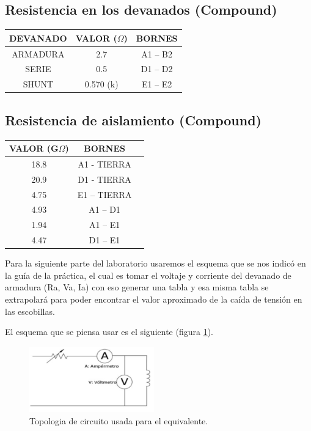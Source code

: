 \subsection*{Resistencia en los devanados (Compound)}

\begin{tabular}{|c|c|c|}
\hline
DEVANADO & VALOR ($\Omega$) & BORNES \\
\hline
ARMADURA & 2.7 & A1 – B2 \\
SERIE & 0.5 & D1 – D2 \\
SHUNT & 0.570 (k) & E1 – E2 \\
\hline
\end{tabular}

\subsection*{Resistencia de aislamiento (Compound)}

\begin{tabular}{|c|c|c|}
\hline
VALOR (G$\Omega$) & BORNES \\
\hline
18.8 & A1 - TIERRA \\
20.9 & D1 - TIERRA \\
4.75 & E1 – TIERRA \\
4.93 & A1 – D1 \\
1.94 & A1 – E1 \\
4.47 & D1 – E1 \\
\hline
\end{tabular}

Para la siguiente parte del laboratorio usaremos el esquema que se nos indicó en la guía de la práctica, el cual es tomar el voltaje y corriente del devanado de armadura (Ra, Va, Ia) con eso generar una tabla y esa misma tabla se extrapolará para poder encontrar el valor aproximado de la caída de tensión en las escobillas.

El esquema que se piensa usar es el siguiente (figura \ref{fig:modelol}).
\begin{figure}[ht!]
    \centering
    \includegraphics[width=0.48\textwidth]{fot/Prac_6_modelo.png}
    \caption{Topologia de circuito usada para el equivalente.}
    \label{fig:modelol}
\end{figure}


